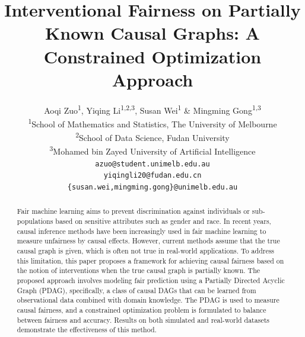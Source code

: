 \documentclass{article} %
\title{Interventional Fairness on Partially Known Causal Graphs: A Constrained Optimization Approach}
\author{Aoqi Zuo\textsuperscript{1}, Yiqing Li\textsuperscript{1,2,3}, Susan Wei\textsuperscript{1} \& Mingming Gong\textsuperscript{1,3}%
\\
\textsuperscript{1}School of Mathematics and Statistics, The University of Melbourne \\ 
\textsuperscript{2}School of Data Science, Fudan University \\
\textsuperscript{3}Mohamed bin Zayed University of Artificial Intelligence\\
\texttt{azuo@student.unimelb.edu.au} \\
\texttt{yiqingli20@fudan.edu.cn} \\
\texttt{\{susan.wei,mingming.gong\}@unimelb.edu.au}
}
\begin{document}
\maketitle

\doparttoc %
\faketableofcontents

\begin{abstract}

Fair machine learning aims to prevent discrimination against individuals or sub-populations based on sensitive attributes such as gender and race. In recent years, causal inference methods have been increasingly used in fair machine learning to measure unfairness by causal effects. However, current methods assume that the true causal graph is given, which is often not true in real-world applications. To address this limitation, this paper proposes a framework for achieving causal fairness based on the notion of interventions when the true causal graph is partially known. The proposed approach involves modeling fair prediction using a Partially Directed Acyclic Graph (PDAG), specifically, a class of causal DAGs that can be learned from observational data combined with domain knowledge. The PDAG is used to measure causal fairness, and a constrained optimization problem is formulated to balance between fairness and accuracy. Results on both simulated and real-world datasets demonstrate the effectiveness of this method.

\end{abstract}%
\end{document}
